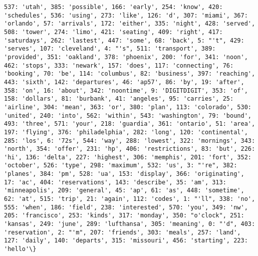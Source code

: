 \documentclass[11pt]{article}
\begin{document}
\begin{Verbatim}[commandchars=\\\{\}]
537: 'utah', 385: 'possible', 166: 'early', 254: 'know', 420: 'schedules', 536: 'using', 273: 'like', 126: 'd', 307: 'miami', 367: 'orlando', 57: 'arrivals', 172: 'either', 335: 'night', 428: 'served', 508: 'tower', 274: 'limo', 421: 'seating', 409: 'right', 417: 'saturdays', 262: 'lastest', 447: 'some', 68: 'back', 5: "'t", 429: 'serves', 107: 'cleveland', 4: "'s", 511: 'transport', 389: 'provided', 351: 'oakland', 378: 'phoenix', 200: 'for', 341: 'noon', 462: 'stops', 333: 'newark', 157: 'does', 117: 'connecting', 76: 'booking', 70: 'be', 114: 'columbus', 82: 'business', 397: 'reaching', 443: 'sixth', 142: 'departures', 46: 'ap57', 86: 'by', 19: 'after', 358: 'on', 16: 'about', 342: 'noontime', 9: 'DIGITDIGIT', 353: 'of', 158: 'dollars', 81: 'burbank', 41: 'angeles', 95: 'carries', 25: 'airline', 304: 'mean', 363: 'or', 380: 'plan', 113: 'colorado', 530: 'united', 240: 'into', 562: 'within', 543: 'washington', 79: 'bound', 493: 'three', 571: 'your', 218: 'guardia', 361: 'ontario', 51: 'area', 197: 'flying', 376: 'philadelphia', 282: 'long', 120: 'continental', 285: 'los', 6: '72s', 544: 'way', 288: 'lowest', 322: 'mornings', 343: 'north', 354: 'offer', 231: 'hp', 406: 'restrictions', 83: 'but', 226: 'hi', 136: 'delta', 227: 'highest', 306: 'memphis', 201: 'fort', 352: 'october', 526: 'type', 298: 'maximum', 532: 'us', 3: "'re", 382: 'planes', 384: 'pm', 528: 'ua', 153: 'display', 366: 'originating', 17: 'ac', 404: 'reservations', 143: 'describe', 35: 'am', 313: 'minneapolis', 209: 'general', 45: 'ap', 61: 'as', 448: 'sometime', 62: 'at', 515: 'trip', 21: 'again', 112: 'codes', 1: "'ll", 338: 'no', 555: 'when', 186: 'field', 238: 'interested', 570: 'you', 349: 'nw', 205: 'francisco', 253: 'kinds', 317: 'monday', 350: "o'clock", 251: 'kansas', 249: 'june', 289: 'lufthansa', 305: 'meaning', 0: "'d", 403: 'reservation', 2: "'m", 207: 'friends', 303: 'meals', 257: 'land', 127: 'daily', 140: 'departs', 315: 'missouri', 456: 'starting', 223: 'hello'\}

\end{Verbatim}
\end{document}
